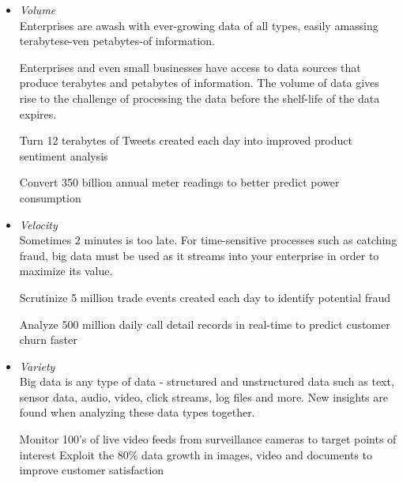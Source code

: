 \documentclass[12pt,a4paper]{report}
\begin{document}
\begin{itemize}
  


\item \emph{Volume} \\
Enterprises are awash with ever-growing data of all types,
easily amassing terabytese-ven petabytes-of information.

Enterprises and even small businesses have access to data sources that
produce terabytes and petabytes of information. The volume of data 
gives rise to the challenge of processing the data before the shelf-life
of the data expires. 

Turn 12 terabytes of Tweets created each day into improved product sentiment analysis

Convert 350 billion annual meter readings to better predict power consumption


\item \emph{Velocity} \\
Sometimes 2 minutes is too late. For time-sensitive processes such as catching fraud,
big data must be used as it streams into your enterprise in order to maximize its value.

Scrutinize 5 million trade events created each day to identify potential fraud

Analyze 500 million daily call detail records in real-time to predict customer churn faster


\item \emph{Variety} \\
Big data is any type of data - structured and unstructured data such as text,
sensor data, audio, video, click streams, log files and more. New insights are found when
analyzing these data types together.

Monitor 100's of live video feeds from surveillance cameras to target points of interest
Exploit the 80\% data growth in images, video and documents to improve customer satisfaction

\end{itemize}

\end{document}
